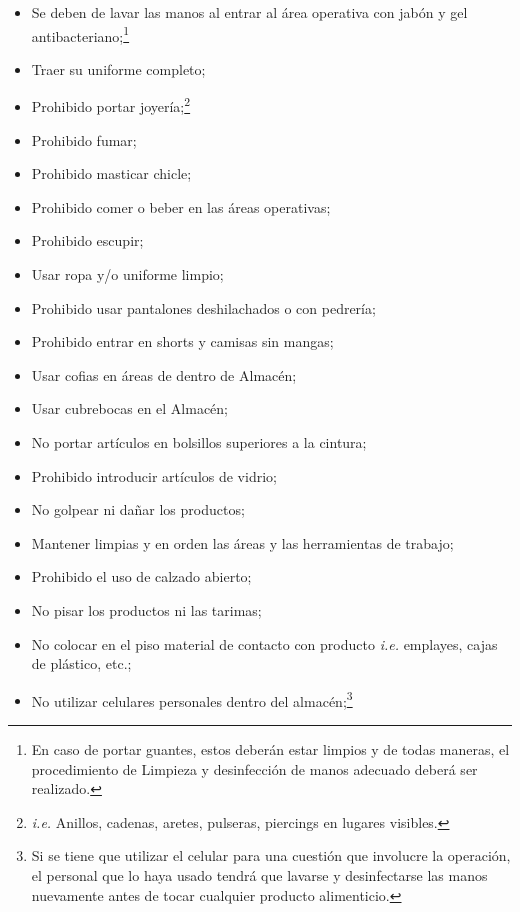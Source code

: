 \begin{center}
        \begin{minipage}{0.9\linewidth}
            \small
            \begin{itemize}
                \item Se deben de lavar las manos al entrar al área operativa con jabón y gel antibacteriano;\footnote{En caso de portar guantes, estos deberán estar limpios y de todas maneras, el procedimiento de Limpieza y desinfección de manos adecuado deberá ser realizado.}
                \item Traer su uniforme completo;
                \item Prohibido portar joyería;\footnote{\textit{i.e.} Anillos, cadenas, aretes, pulseras, piercings en lugares visibles.}
                \item Prohibido fumar;
                \item Prohibido masticar chicle;
                \item Prohibido comer o beber en las áreas operativas;
                \item Prohibido escupir;
                \item Usar ropa y/o uniforme limpio;
                \item Prohibido usar pantalones deshilachados o con pedrería;
                \item Prohibido entrar en shorts y camisas sin mangas;
                \item Usar cofias en áreas de dentro de Almacén;
                \item Usar cubrebocas en el Almacén;
                \item No portar artículos en bolsillos superiores a la cintura;
                \item Prohibido introducir artículos de vidrio;
                \item No golpear ni dañar los productos;
                \item Mantener limpias y en orden las áreas y las herramientas de trabajo;
                \item Prohibido el uso de calzado abierto;
                \item No pisar los productos ni las tarimas;
                \item No colocar en el piso material de contacto con producto \emph{i.e.} emplayes, cajas de plástico, etc.;
                \item No utilizar celulares personales dentro del almacén;\footnote{Si se tiene que utilizar el celular para una cuestión que involucre la operación, el personal que lo haya usado tendrá que lavarse y desinfectarse las manos nuevamente antes de tocar cualquier producto alimenticio.}

\end{itemize}
\end{minipage}
\end{center}
